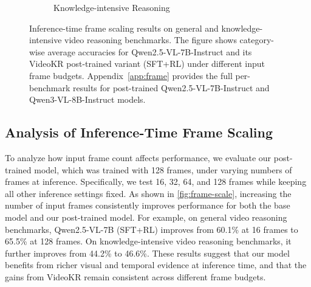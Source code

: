 \documentclass{llmxive}
\providecommand{\ours}{VideoKR\xspace}
\begin{document}
\begin{figure}[t]
\begin{subfigure}[b]{0.48\linewidth}
{%
        }
        \caption{\scriptsize Knowledge-intensive Reasoning}
        \label{fig:right_plot}
    \end{subfigure}
    
    \caption{
    Inference-time frame scaling results on general and knowledge-intensive video reasoning benchmarks. 
    The figure shows category-wise average accuracies for Qwen2.5-VL-7B-Instruct and its VideoKR post-trained variant (SFT+RL) under different input frame budgets. 
    Appendix~\ref{app:frame} provides the full per-benchmark results for post-trained Qwen2.5-VL-7B-Instruct and Qwen3-VL-8B-Instruct models.
    }
    \label{fig:frame-scale}
\end{figure}








\subsection{Analysis of Inference-Time Frame Scaling}
\label{sec:6.2}

To analyze how input frame count affects performance, we evaluate our post-trained model, which was trained with 128 frames, under varying numbers of frames at inference. Specifically, we test 16, 32, 64, and 128 frames while keeping all other inference settings fixed. As shown in \autoref{fig:frame-scale}, increasing the number of input frames consistently improves performance for both the base model and our post-trained model. For example, on general video reasoning benchmarks, Qwen2.5-VL-7B (SFT+RL) improves from 60.1\% at 16 frames to 65.5\% at 128 frames. On knowledge-intensive video reasoning benchmarks, it further improves from 44.2\% to 46.6\%. These results suggest that our model benefits from richer visual and temporal evidence at inference time, and that the gains from \ours remain consistent across different frame budgets.
\end{document}

